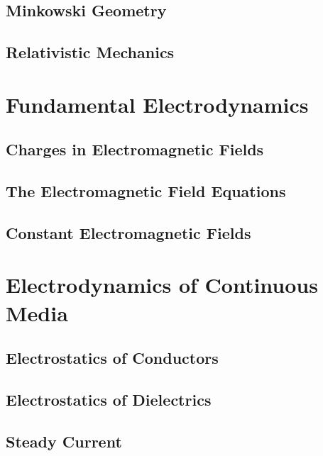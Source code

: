 \documentclass[
    ebook,
    11pt,
    oneside,
    onecolumn,
    openright,
    final
]{memoir}
\numberwithin{equation}{section}
\begin{document}
\chapter{Minkowski Geometry}

\chapter{Relativistic Mechanics}

\part{Fundamental Electrodynamics}

\chapter[Charges in EM Fields]{Charges in Electromagnetic Fields}






\chapter[The EM Field Equations]{The Electromagnetic Field Equations}

\chapter[Constant EM Fields]{Constant Electromagnetic Fields}

\part{Electrodynamics of Continuous Media}

\chapter{Electrostatics of Conductors}

\chapter{Electrostatics of Dielectrics}

\chapter{Steady Current}
\end{document}
